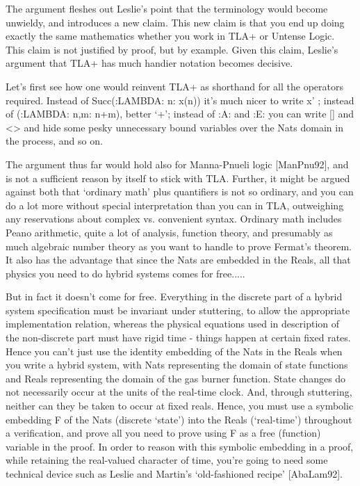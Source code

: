 \begin{spec}
The argument fleshes out Leslie's point that the terminology would
become unwieldy, and introduces a new claim. This new claim is that
you end up doing exactly the same mathematics whether you work in
TLA+ or Untense Logic. This claim is not justified by proof, but
by example. Given this claim, Leslie's argument that TLA+ has much
handier notation becomes decisive.

Let's first see how one would reinvent TLA+ as shorthand for all the
operators required. Instead of Succ(:LAMBDA: n: x(n)) it's much
nicer to write x' ; instead of (:LAMBDA: n,m: n+m), better `+';
instead of :A: and :E: you can write [] and <> and hide some pesky
unnecessary bound variables over the Nats domain in the process, and
so on.

The argument thus far would hold also for Manna-Pnueli logic
[ManPnu92], and is not a sufficient reason by itself to stick with
TLA.  Further, it might be argued against both that `ordinary math'
plus quantifiers is not so ordinary, and you can do a lot more
without special interpretation than you can in TLA, outweighing any
reservations about complex vs. convenient syntax.  Ordinary math
includes Peano arithmetic, quite a lot of analysis, function theory,
and presumably as much algebraic number theory as you want to handle
to prove Fermat's theorem.  It also has the advantage that since the
Nats are embedded in the Reals, all that physics you need to do
hybrid systems comes for free.....

But in fact it doesn't come for free.  Everything in the discrete
part of a hybrid system specification must be invariant under
stuttering, to allow the appropriate implementation relation,
whereas the physical equations used in description of the
non-discrete part must have rigid time - things happen at certain
fixed rates.  Hence you can't just use the identity embedding of the
Nats in the Reals when you write a hybrid system, with Nats
representing the domain of state functions and Reals representing
the domain of the gas burner function.  State changes do not
necessarily occur at the units of the real-time clock.  And, through
stuttering, neither can they be taken to occur at fixed reals.
Hence, you must use a symbolic embedding F of the Nats (discrete
`state') into the Reals (`real-time') throughout a verification, and
prove all you need to prove using F as a free (function) variable in
the proof. In order to reason with this symbolic embedding in a
proof, while retaining the real-valued character of time, you're
going to need some technical device such as Leslie and Martin's
`old-fashioned recipe' [AbaLam92].


\end{spec}
